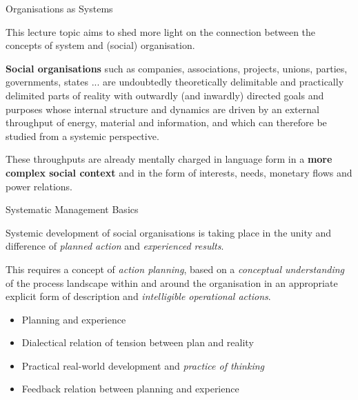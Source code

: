\documentclass{beamer}
\begin{document}
\begin{frame}{Organisations as Systems}

This lecture topic aims to shed more light on the connection between the
concepts of system and (social) organisation.

\textbf{Social organisations} such as companies, associations, projects,
unions, parties, governments, states ... are undoubtedly theoretically
delimitable and practically delimited parts of reality with outwardly (and
inwardly) directed goals and purposes whose internal structure and dynamics
are driven by an external throughput of energy, material and information, and
which can therefore be studied from a systemic perspective.

These throughputs are already mentally charged in language form in a
\textbf{more complex social context} and in the form of interests, needs,
monetary flows and power relations.
\end{frame}
  
\begin{frame}{Systematic Management Basics}

Systemic development of social organisations is taking place in the unity and
difference of \emph{planned action} and \emph{experienced results}.

This requires a concept of \emph{action planning}, based on a \emph{conceptual
  understanding} of the process landscape within and around the organisation
in an appropriate explicit form of description and \emph{intelligible
  operational actions}.
  
  \begin{itemize}
  \item Planning and experience
  \item Dialectical relation of tension between plan and reality
  \item Practical real-world development and \emph{practice of thinking}
  \item Feedback relation between planning and experience
  \end{itemize}

\end{frame}
\end{document}
